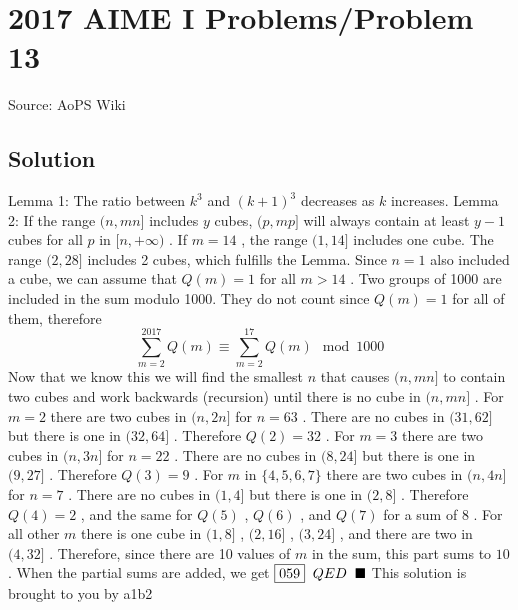 \documentclass[12pt]{article}
\begin{document}
\section*{{2017 AIME I Problems/Problem 13}}
Source: AoPS Wiki

\subsection*{Solution}
Lemma 1: The ratio between $k^3$ and $(k+1)^3$ decreases as $k$ increases. Lemma 2: If the range $(n,mn]$ includes $y$ cubes, $(p,mp]$ will always contain at least $y-1$ cubes for all $p$ in $[n,+\infty)$ . If $m=14$ , the range $(1,14]$ includes one cube. The range $(2,28]$ includes 2 cubes, which fulfills the Lemma. Since $n=1$ also included a cube, we can assume that $Q(m)=1$ for all $m>14$ . Two groups of 1000 are included in the sum modulo 1000. They do not count since $Q(m)=1$ for all of them, therefore \[\sum_{m = 2}^{2017} Q(m) \equiv \sum_{m = 2}^{17} Q(m) \mod 1000\] Now that we know this we will find the smallest $n$ that causes $(n,mn]$ to contain two cubes and work backwards (recursion) until there is no cube in $(n,mn]$ . For $m=2$ there are two cubes in $(n,2n]$ for $n=63$ . There are no cubes in $(31,62]$ but there is one in $(32,64]$ . Therefore $Q(2)=32$ . For $m=3$ there are two cubes in $(n,3n]$ for $n=22$ . There are no cubes in $(8,24]$ but there is one in $(9,27]$ . Therefore $Q(3)=9$ . For $m$ in $\{4,5,6,7\}$ there are two cubes in $(n,4n]$ for $n=7$ . There are no cubes in $(1,4]$ but there is one in $(2,8]$ . Therefore $Q(4)=2$ , and the same for $Q(5)$ , $Q(6)$ , and $Q(7)$ for a sum of $8$ . For all other $m$ there is one cube in $(1,8]$ , $(2,16]$ , $(3,24]$ , and there are two in $(4,32]$ . Therefore, since there are 10 values of $m$ in the sum, this part sums to $10$ . When the partial sums are added, we get $\boxed{059}\hspace{2 mm}QED\hspace{2 mm} \blacksquare$ This solution is brought to you by a1b2
\end{document}
